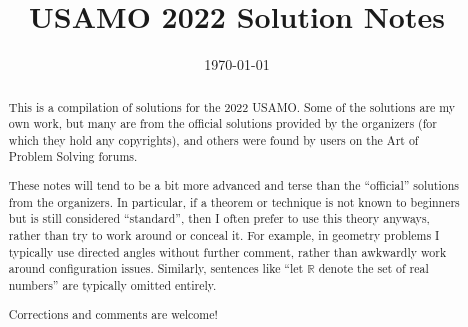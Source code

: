 \documentclass[11pt]{scrartcl}
\title{USAMO 2022 Solution Notes}
\date{\today}
\begin{document}
\maketitle

\begin{abstract}
This is a compilation of solutions
for the 2022 USAMO.
Some of the solutions are my own work,
but many are from the official solutions provided by the organizers
(for which they hold any copyrights),
and others were found by users on the Art of Problem Solving forums.

These notes will tend to be a bit more advanced and terse than the ``official''
solutions from the organizers.
In particular, if a theorem or technique is not known to beginners
but is still considered ``standard'', then I often prefer to
use this theory anyways, rather than try to work around or conceal it.
For example, in geometry problems I typically use directed angles
without further comment, rather than awkwardly work around configuration issues.
Similarly, sentences like ``let $\mathbb{R}$ denote the set of real numbers''
are typically omitted entirely.

Corrections and comments are welcome!
\end{abstract}

\tableofcontents
\newpage

\addtocounter{section}{-1}
\end{document}
